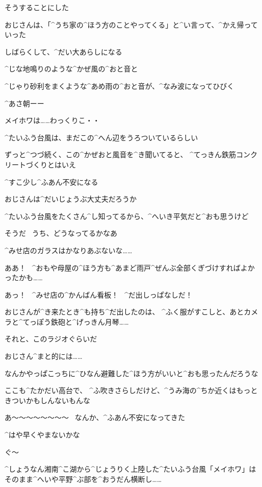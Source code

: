 \Alpha そうすることにした

\page[101]
\Alpha おじさんは、「^{うち}{家}の^{ほう}{方}のことやってくる」と^{い}{言}って、^{かえ}{帰}っていった

\Alpha しばらくして、^{だい}{大}あらしになる

\Alpha ^{じな}{地鳴}りのような^{かぜ}{風}の^{おと}{音}と

\Alpha ^{じゃり}{砂利}をまくような^{あめ}{雨}の^{おと}{音}が、^{なみ}{波}になってひびく

\page[102]
\Alpha ^{あさ}{朝}ーー

\Person メイホワは……わっくりこ・・

\page[103]
\Alpha ^{たいふう}{台風}は、まだこの^{へん}{辺}をうろついているらしい

\Alpha ずっと^{つづ}{続}く、この^{かぜおと}{風音}を^{き}{聞}いてると、
^{てっきん}{鉄筋}コンクリートづくりとはいえ

\Alpha ^{すこ}{少}し^{ふあん}{不安}になる

\Alpha おじさんは^{だいじょうぶ}{大丈夫}だろうか

\Alpha ^{たいふう}{台風}をたくさん^{し}{知}ってるから、^{へいき}{平気}だと^{おも}{思}うけど

\page[104]
\Alpha そうだ
\ うち、どうなってるかなあ

\Alpha ^{みせ}{店}のガラスはかなりあぶないな……

\Alpha ああ！
\ ^{おもや}{母屋}の^{ほう}{方}も^{あまど}{雨戸}^{ぜんぶ}{全部}くぎづけすればよかったかも……

\Alpha あっ！
\ ^{みせ}{店}の^{かんばん}{看板}！
\ ^{だ}{出}しっぱなしだ！

\Alpha おじさんが^{き}{来}たとき^{も}{持}ち^{だ}{出}したのは、
^{ふく}{服}がすこしと、あとカメラと^{てっぽう}{鉄砲}と^{げっきん}{月琴}……

\Alpha それと、このラジオぐらいだ

\page[105]
\Alpha おじさん^{まと}{的}には……

\Alpha なんかやっぱこっちに^{ひなん}{避難}した^{ほう}{方}がいいと^{おも}{思}ったんだろうな

\Alpha ここも^{たかだい}{高台}で、
^{ふ}{吹}きさらしだけど、^{うみ}{海}の^{ちか}{近}くはもっときついかもしんないもんな

\Alpha あ〜〜〜〜〜〜〜〜
\ なんか、^{ふあん}{不安}になってきた

\Alpha ^{はや}{早}くやまないかな

\Alpha ぐ〜

\page[108]
\Person ^{しょうなん}{湘南}^{こ}{湖}から^{じょうりく}{上陸}した^{たいふう}{台風}「メイホワ」は
そのまま^{へいや}{平野}^{ぶ}{部}を^{おうだん}{横断}し……

